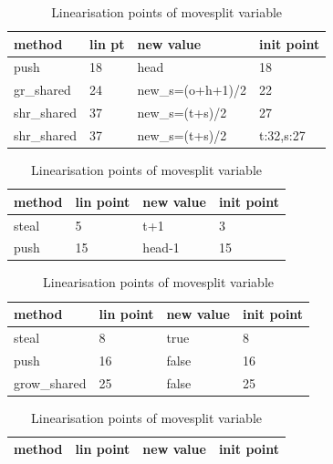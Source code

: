 \documentclass{sig-alternate-br}
\begin{document}
\begin{table}[h]
\begin{subtable}[h]{0.45\textwidth}
\begin{tabular}{|l|l|l|l|}
			\hline
			\textbf{method} & \textbf{lin pt} & \textbf{new value} & \textbf{init point}\\ \hline
			push            & 18                 & head        & 18\\ \hline
			gr\_shared    & 24                 & new\_s=(o+h+1)/2      & 22\\ \hline
			shr\_shared  & 37                 & new\_s=(t+s)/2      & 27\\ \hline
			shr\_shared  & 37                 & new\_s=(t+s)/2      & t:32,s:27\\ \hline
		\end{tabular}
		\caption{Linearisation points of o\_split variable.}
		\label{tab:osplit}
	\end{subtable}
	\hfill
	\begin{subtable}[h]{0.45\textwidth}
		\centering
		\begin{tabular}{|l|l|l|l|}
			\hline
			\textbf{method} & \textbf{lin point} & \textbf{new value} & \textbf{init point}\\ \hline
			steal           & 5                  & t+1         & 3\\ \hline
			push            & 15                 & head-1      & 15\\ \hline
		\end{tabular}
		\caption{Linearisation points of tail variable}
		\label{tab:tail}
	\end{subtable}
	\begin{subtable}[h]{0.45\textwidth}
		\centering
		\begin{tabular}{|l|l|l|l|}
			\hline
			\textbf{method} & \textbf{lin point} & \textbf{new value} & \textbf{init point}\\ \hline
			steal           & 8                  & true        & 8                   \\ \hline
			push            & 16                 & false       & 16                  \\ \hline
			grow\_shared    & 25                 & false       & 25             \\ \hline
		\end{tabular}
		\caption{Linearisation points of movesplit variable}
		\label{tab:move}
	\end{subtable}
	\begin{subtable}[h]{0.45\textwidth}
		\centering
		\begin{tabular}{|l|l|l|l|}
			\hline
			\textbf{method} & \textbf{lin point} & \textbf{new value} & \textbf{init point}\\ \hline

\end{tabular}
\end{subtable}
\end{table}
\end{document}
